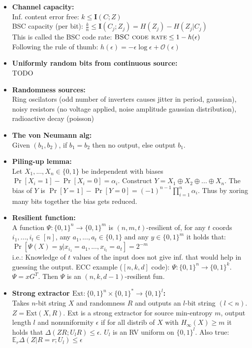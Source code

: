 \documentclass[twocolumn,9pt]{extarticle}
\begin{document}
\begin{itemize}
	\item \textbf{Channel capacity:} \\
	Inf. content error free: $k \leq \mathbf{I}(C;Z)$\\
	BSC capacity (per bit): $\frac{k}{n} \leq \mathbf{I}(C_j;Z_j) = H(Z_j) - H(Z_j|C_j)$ \\
	This is called the BSC code rate: $\textsc{BSC code rate} \leq 1 - h(\epsilon)$ \\
	Following the rule of thumb: $h(\epsilon) = -\epsilon \log \epsilon + \mathcal{O}(\epsilon)$

	\item \textbf{Uniformly random bits from continuous source:} \\
	TODO

	\item \textbf{Randomness sources: } \\
	Ring oscilators (odd number of inverters causes jitter in period, gaussian), noisy resistors (no voltage applied, noise amplitude gaussian distribution), radioactive decay (poisson)

	\item \textbf{The von Neumann alg: } \\
	Given $(b_1, b_2)$, if $b_1 = b_2$ then no output, else output $b_1$.

	\item \textbf{Piling-up lemma: } \\
	Let $X_1, ..., X_n \in \{0,1\}$ be independent with biases $\Pr[X_i=1]-\Pr[X_i=0]=\alpha_i$. Construct $Y = X_1 \oplus X_2 \oplus ... \oplus X_n$. The bias of $Y$ is $\Pr[Y=1]-\Pr[Y=0] = (-1)^{n-1} \prod_{i=1}^n \alpha_i$. Thus by xoring many bits together the bias gets reduced.

	\item \textbf{Resilient function:} \\
	A function $\Psi : \{0,1\}^n \rightarrow \{0,1\}^m$ is $(n,m,t)$-resilient of, for any $t$ coords $i_1,...,i_t \in [n]$, any $a_1,...,a_t \in \{0,1\}$ and any $y \in \{0,1\}^m$ it holds that: $\Pr[\Psi(X)=y|x_{i_1}=a_1,...,x_{i_t}=a_t] = 2^{-m}$\\
	i.e.: Knowledge of $t$ values of the input does not give inf. that would help in guessing the output. ECC example ($[n,k,d]$ code): $\Psi : \{0,1\}^n \rightarrow \{0,1\}^k$. $\Psi = xG^T$. Then $\Psi$ is an $(n,k,d-1)$-resilient fun.

	\item \textbf{Strong extractor $\text{Ext} : \{0,1\}^n \times \{0,1\}^* \rightarrow \{0,1\}^l$:} \\
	Takes $n$-bit string $X$ and randomness $R$ and outputs an $l$-bit string $(l < n)$. $Z = \text{Ext}(X,R)$. Ext is a strong extractor for source min-entropy $m$, output length $l$ and nonuniformity $\epsilon$ if for all distrib of $X$ with $H_\infty(X) \geq m$ it holds that $\Delta(ZR;U_lR) \leq \epsilon$. $U_l$ is an RV uniform on $\{0,1\}^l$. Also true: $\mathbb{E}_r\Delta(Z|R=r;U_l)\leq\epsilon$


\end{itemize}
\end{document}
